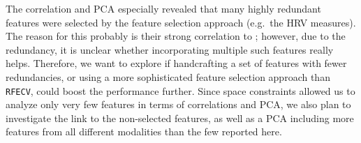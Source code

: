 \documentclass[output=paper]{langsci/langscibook}
\begin{document}
The correlation and PCA especially revealed that many highly redundant features were selected by the feature selection approach (e.g.\ the HRV measures).
The reason for this probably is their strong correlation to \subjCL{}; however, due to the redundancy, it is unclear whether incorporating multiple such features really helps.
Therefore, we want to explore if handcrafting a set of features with fewer redundancies, or using a more sophisticated feature selection approach than \texttt{RFECV}, could boost the performance further. %
Since space constraints allowed us to analyze only very few features in terms of correlations and PCA, we also plan to investigate the link to the non-selected features, as well as a PCA including more features from all different modalities than the few reported here.

\end{document}
